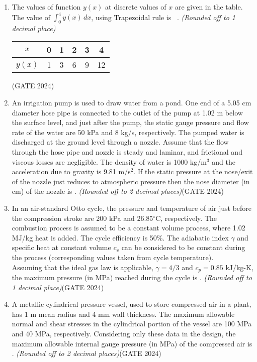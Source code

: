 \documentclass[journal,12pt,onecolumn]{IEEEtran}
\theoremstyle{remark}
\begin{document}
\begin{enumerate}
\item The values of function $y(x)$ at discrete values of $x$ are given in the table. The value of $\int_{0}^{4} y(x)\,dx$, using Trapezoidal rule is \underline{\hspace{2cm}}~. \textit{(Rounded off to 1 decimal place)}
\begin{center}
\begin{tabular}{|c|c|c|c|c|c|}
\hline
$x$ & 0 & 1 & 2 & 3 & 4 \\
\hline
$y(x)$ & 1 & 3 & 6 & 9 & 12 \\
\hline
\end{tabular}
\end{center}\hfill{(GATE 2024)}
\vspace{1cm}
\item An irrigation pump is used to draw water from a pond. One end of a 5.05 cm diameter hose pipe is connected to the outlet of the pump at 1.02 m below the surface level, and just after the pump, the static gauge pressure and flow rate of the water are 50 kPa and 8 kg/s, respectively. The pumped water is discharged at the ground level through a nozzle. Assume that the flow through the hose pipe and nozzle is steady and laminar, and frictional and viscous losses are negligible. The density of water is 1000 kg/m$^3$ and the acceleration due to gravity is 9.81 m/s$^2$. If the static pressure at the nose/exit of the nozzle just reduces to atmospheric pressure then the nose diameter (in cm) of the nozzle is \underline{\hspace{2cm}}. \textit{(Rounded off to 2 decimal places)}\hfill{(GATE 2024)}
\vspace{1cm}

\item In an air-standard Otto cycle, the pressure and temperature of air just before the compression stroke are 200 kPa and 26.85$^\circ$C, respectively. The combustion process is assumed to be a constant volume process, where 1.02 MJ/kg heat is added. The cycle efficiency is 50\%. The adiabatic index $\gamma$ and specific heat at constant volume $c_v$ can be considered to be constant during the process (corresponding values taken from cycle temperature).\\
Assuming that the ideal gas law is applicable, $\gamma = 4/3$ and $c_p = 0.85$ kJ/kg-K, the maximum pressure (in MPa) reached during the cycle is \underline{\hspace{2cm}}. \textit{(Rounded off to 1 decimal place)}\hfill{(GATE 2024)}
\vspace{1cm}
\newpage
\item A metallic cylindrical pressure vessel, used to store compressed air in a plant, has 1 m mean radius and 4 mm wall thickness. The maximum allowable normal and shear stresses in the cylindrical portion of the vessel are 100 MPa and 40 MPa, respectively. Considering only these data in the design, the maximum allowable internal gauge pressure (in MPa) of the compressed air is \underline{\hspace{2cm}}. \textit{(Rounded off to 2 decimal places)}\hfill{(GATE 2024)}
\vspace{1cm}


\end{enumerate}
\end{document}
